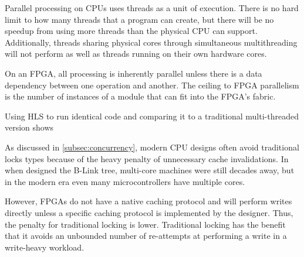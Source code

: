 
Parallel processing on CPUs uses threads as a unit of execution. There is no
hard limit to how many threads that a program can create, but there will be no
speedup from using more threads than the physical CPU can support. Additionally,
threads sharing physical cores through simultaneous multithreading will not
perform as well as threads running on their own hardware cores.

On an FPGA, all processing is inherently parallel unless there is a data
dependency between one operation and another. The ceiling to FPGA parallelism is
the number of instances of a module that can fit into the FPGA's fabric.

Using HLS to run identical code and comparing it to a traditional multi-threaded
version shows \todo{\ldots}



As discussed in \autoref{subsec:concurrency}, modern CPU designs often avoid
traditional locks types because of the heavy penalty of unnecessary cache
invalidations. In \citeyear{b-link} when \citeauthor{b-link} designed the B-Link
tree, multi-core machines were still decades away, but in the modern era even
many microcontrollers have multiple cores.

However, FPGAs do not have a native caching protocol and will perform writes
directly unless a specific caching protocol is implemented by the designer.
Thus, the penalty for traditional locking is lower. Traditional locking has the
benefit that it avoids an unbounded number of re-attempts at performing a write
in a write-heavy workload.




